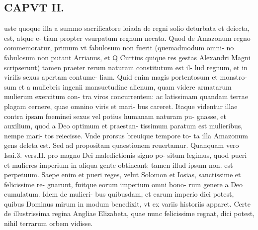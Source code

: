 \documentclass{article}
\begin{document}
\begin{pages}
\section*{CAPVT II. }
\marginpar{[ p.85. ]}\pstart uste quoque illa a summo sacrificatore loiada de regni solio deturbata et deiecta, est, atque e- tiam propter vsurpatum regnum necata. Quod de Amazonum regno commemoratur, primum vt fabulosum non fuerit (quemadmodum omni- no fabulosum non putant Arrianus, et Q Curtius quique res gestas Alexandri Magni scripserunt) tamen praeter rerum naturam constitutum est il- lud regnum, et in virilis sexus apertam contume- liam. Quid enim magis portentosum et monstro- sum et a muliebris ingenii mansuetudine alienum, quam videre armatarum mulierum exercitum con- tra viros concurrentem: ac latissimam quandam terrae plagam cernere, quae omnino viris et mari- bus careret. Itaque videntur illae contra ipsam foeminei sexus vel potius humanam naturam pu- gnasse, et auxilium, quod a Deo optimum et praestan- tissimum paratum est mulieribus, nempe mari- tos reiecisse. Vnde prorsus breuique  tempore to- ta illa Amazonum gens deleta est. Sed ad propositam quaestionem reuertamur. Quanquam vero Isai.3. vers.II. pro magno Dei maledictionis signo po- situm legimus, quod pueri et mulieres imperium in aliqua gente obtineant: tamen illud ipsum non. est perpetuum. Saepe enim et pueri reges, velut Solomon et Iosias, sanctissime et felicissime re- gnarunt, fuitque eorum imperium omni bono- rum genere a Deo cumulatum. Idem de mulieri- bus quibusdam, et earum imperio dici potest, quibus Dominus mirum in modum benedixit, vt ex variis historiis apparet. Certe de illustrissima regina Angliae Elizabeta, quae nunc felicissime regnat, dici potest, nihil terrarum orbem vidisse.  \pend

\end{pages}
\end{document}

